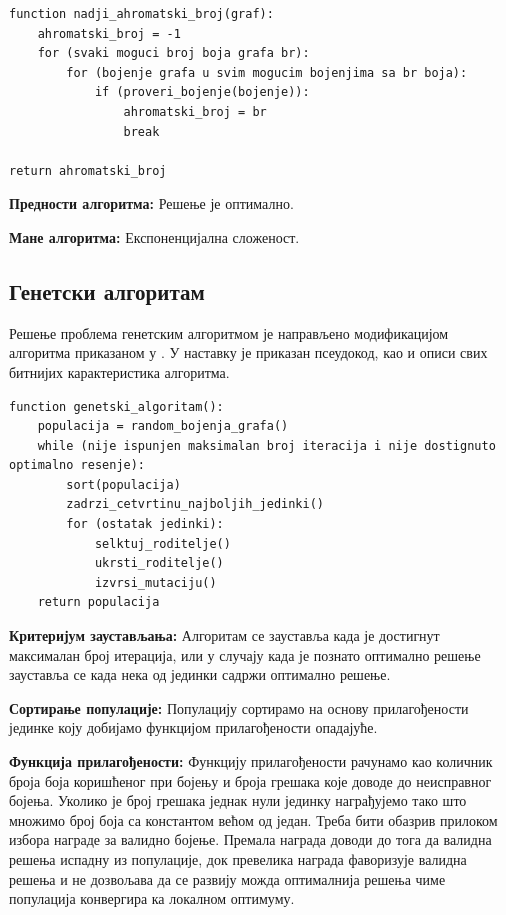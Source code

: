 \documentclass[a4paper]{article}
\begin{document}
{\begin{lstlisting}[caption={Псеудо-код алгоритма исцрпне претраге},frame=single]
function nadji_ahromatski_broj(graf):
	ahromatski_broj = -1
	for (svaki moguci broj boja grafa br):
		for (bojenje grafa u svim mogucim bojenjima sa br boja):
			if (proveri_bojenje(bojenje)):
				ahromatski_broj = br
				break
		
return ahromatski_broj 
\end{lstlisting}

\textbf{Предности алгоритма:} Решење је оптимално.

\textbf{Мане алгоритма:} Експоненцијална сложеност.

\subsection{Генетски алгоритам}
Решење проблема генетским алгоритмом је направљено модификацијом алгоритма приказаном у \cite{geneticachr}. У наставку је приказан псеудокод, као и описи свих битнијих карактеристика алгоритма. \\

\begin{lstlisting}[caption={Псеудо-код генетског алгоритма},frame=single]
function genetski_algoritam():
	populacija = random_bojenja_grafa()
	while (nije ispunjen maksimalan broj iteracija i nije dostignuto optimalno resenje):
		sort(populacija)
		zadrzi_cetvrtinu_najboljih_jedinki()
		for (ostatak jedinki):
			selktuj_roditelje()
			ukrsti_roditelje()
			izvrsi_mutaciju()
	return populacija
\end{lstlisting}

\textbf{Критеријум заустављања:} Алгоритам се зауставља када је достигнут максималан број итерација, или у случају када је познато оптимално решење зауставља се када нека од јединки садржи оптимално решење.

\textbf{Сортирање популације:} Популацију сортирамо на основу прилагођености јединке коју добијамо функцијом прилагођености опадајуће. 

\textbf{Функција прилагођености:} Функцију прилагођености рачунамо као количник броја боја коришћеног при бојењу и броја грешака које доводе до неисправног бојења. Уколико је број грешака једнак нули јединку награђујемо тако што множимо број боја са константом већом од један. Треба бити обазрив прилоком избора награде за валидно бојење. Премала награда доводи до тога да валидна решења испадну из популације, док превелика награда фаворизује валидна решења и не дозвољава да се развију можда оптималнија решења чиме популација конвергира ка локалном оптимуму.

}
\end{document}
